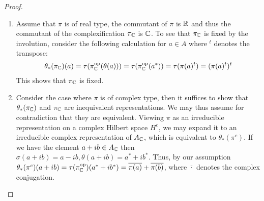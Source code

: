 \begin{proof}
\begin{enumerate}
\item 
	Assume that $\pi$ is of real type, the commutant of $\pi$ is $\mathbb{R}$ and thus the commutant of the complexification $\pi_{\mathbb{C}}$ is $\mathbb{C}$. To see that $\pi_{\mathbb{C}}$ is fixed by the involution, consider the following calculation for $a\in A$ where $^t$ denotes the transpose:
	\begin{align*}
		\theta_*(\pi_{\mathbb{C}})(a)=\tau(\pi_{\mathbb{C}}^{\operatorname{op}}(\theta(a)))=\tau(\pi_{\mathbb{C}}^{\operatorname{op}}(a^*))=\tau(\pi(a)^t)=(\pi(a)^t)^t
	\end{align*}
	This shows that $\pi_{\mathbb{C}}$ is fixed. 
	\item
		Consider the case where $\pi$ is of complex type, then it suffices to show that $\theta_*(\pi_{\mathbb{C}})$ and $\pi_{\mathbb{C}}$ are inequivalent representations. We may thus assume for contradiction that they are equivalent. Viewing $\pi$ as an irreducible representation on a complex Hilbert space $H^c$, we may expand it to an irreducible complex representation of $A_{\mathbb{C}}$, which is equivalent to $\theta_*(\pi^c)$. If we have the element $a+ib\in A_{\mathbb{C}}$ then $\sigma(a+ib)=a-ib,\theta(a+ib)=a^*+ib^*$. Thus, by our assumption $\theta_*(\pi^c)(a+ib)=\tau(\pi_{\mathbb{C}}^{\operatorname{op}})(a^*+ib^*)=\overline{\pi(a)}+\overline{\pi(b)}$, where $\overline{\cdot}$ denotes the complex conjugation. 



\end{enumerate}
\end{proof}

